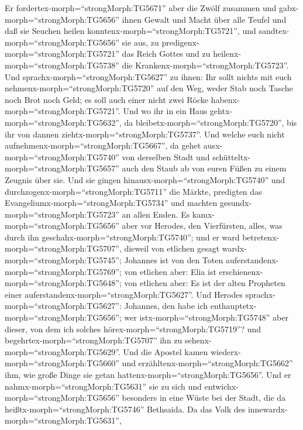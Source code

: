  Er fordertex-morph=``strongMorph:TG5671'' aber die Zwölf
zusammen und gabx-morph=``strongMorph:TG5656'' ihnen Gewalt und Macht
über alle Teufel und daß sie Seuchen heilen
konntenx-morph=``strongMorph:TG5721'',  und
sandtex-morph=``strongMorph:TG5656'' sie aus, zu
predigenx-morph=``strongMorph:TG5721'' das Reich Gottes und zu
heilenx-morph=``strongMorph:TG5738'' die
Krankenx-morph=``strongMorph:TG5723''.  Und
sprachx-morph=``strongMorph:TG5627'' zu ihnen: Ihr sollt nichts mit euch
nehmenx-morph=``strongMorph:TG5720'' auf den Weg, weder Stab noch Tasche
noch Brot noch Geld; es soll auch einer nicht zwei Röcke
habenx-morph=``strongMorph:TG5721''.  Und wo ihr in ein Haus
gehtx-morph=``strongMorph:TG5632'', da
bleibetx-morph=``strongMorph:TG5720'', bis ihr von dannen
ziehtx-morph=``strongMorph:TG5737''.  Und welche euch nicht
aufnehmenx-morph=``strongMorph:TG5667'', da gehet
ausx-morph=``strongMorph:TG5740'' von derselben Stadt und
schütteltx-morph=``strongMorph:TG5657'' auch den Staub ab von euren
Füßen zu einem Zeugnis über sie.  Und sie gingen
hinausx-morph=``strongMorph:TG5740'' und
durchzogenx-morph=``strongMorph:TG5711'' die Märkte, predigten das
Evangeliumx-morph=``strongMorph:TG5734'' und machten
gesundx-morph=``strongMorph:TG5723'' an allen Enden.  Es
kamx-morph=``strongMorph:TG5656'' aber vor Herodes, den Vierfürsten,
alles, was durch ihn geschahx-morph=``strongMorph:TG5740''; und er ward
betretenx-morph=``strongMorph:TG5707'', dieweil von etlichen gesagt
wardx-morph=``strongMorph:TG5745''; Johannes ist von den Toten
auferstandenx-morph=``strongMorph:TG5769'';  von etlichen
aber: Elia ist erschienenx-morph=``strongMorph:TG5648''; von etlichen
aber: Es ist der alten Propheten einer
auferstandenx-morph=``strongMorph:TG5627''.  Und Herodes
sprachx-morph=``strongMorph:TG5627'': Johannes, den habe ich
enthauptetx-morph=``strongMorph:TG5656''; wer
istx-morph=``strongMorph:TG5748'' aber dieser, von dem ich solches
hörex-morph=``strongMorph:TG5719''? und
begehrtex-morph=``strongMorph:TG5707'' ihn zu
sehenx-morph=``strongMorph:TG5629''.  Und die Apostel kamen
wiederx-morph=``strongMorph:TG5660'' und
erzähltenx-morph=``strongMorph:TG5662'' ihm, wie große Dinge sie getan
hattenx-morph=``strongMorph:TG5656''. Und er
nahmx-morph=``strongMorph:TG5631'' sie zu sich und
entwichx-morph=``strongMorph:TG5656'' besonders in eine Wüste bei der
Stadt, die da heißtx-morph=``strongMorph:TG5746'' Bethsaida.
 Da das Volk des innewardx-morph=``strongMorph:TG5631'',
